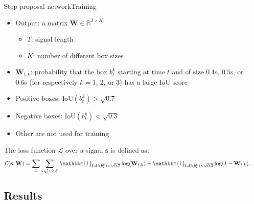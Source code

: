\documentclass[9pt,t,aspectratio=1610]{beamer}
\newcommand{\bfs}{\mathbf{s}}
\newcommand{\bbmind}{\mathbbm{1}}
\newcommand{\iou}{\mathrm{IoU}}
\begin{document}
\begin{frame}{Step proposal network}{Training}
\begin{itemize}
    \item Output: a matrix $\mathbf{W} \in \mathbb{R}^{T \times K}$
    \begin{itemize}
        \item $T$: signal length
        \item $K$: number of different box sizes
    \end{itemize}

    \item $\mathbf{W}_{t,k}$: probability that the box $b_t^k$ starting at time $t$ and of size $0.4$s, $0.5$s, or $0.6$s (for respectively $k=1$, $2$, or $3$) has a large $\iou$ score
    \item Positive boxes: $\iou(b_t^{k}) > \sqrt{0.7}$
    \item Negative boxes: $\iou(b_t^{k}) < \sqrt{0.3}$
    \item Other are not used for training
\end{itemize}

\vspace{0.8cm}

The loss function $\mathcal{L}$ over a signal $\bfs$ is defined as:
\begin{equation*}\label{eq: loss training CNN}
\mathcal{L}(\bfs, \mathbf{W}) = \sum_{t} \sum_{k \in \left[1, 2, 3 \right]} \bbmind_{ \iou(b_t^{k})> \sqrt{0.7} } \log(\mathbf{W}_{t,k}) + \bbmind_{ \iou(b_t^{k})< \sqrt{0.3} } \log(1-\mathbf{W}_{t,k}). 
\end{equation*}
\end{frame}

\subsection{Results}

\begin{frame}[noframenumbering]{\ }
\hfill
\parbox[t]{.85\textwidth}{
  \begin{minipage}[c][0.65\textheight]{\textwidth}
  \tableofcontents[currentsection, subsectionstyle=show/shaded/shaded]
  \end{minipage}
}
\end{frame}
\end{document}
